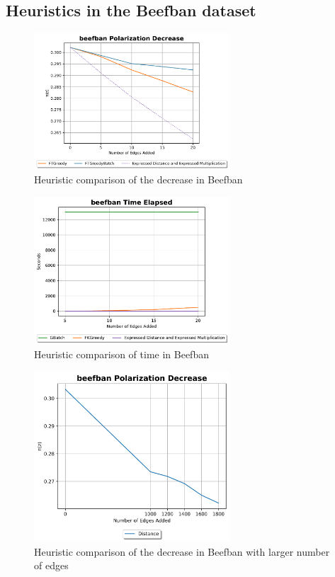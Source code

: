 \clearpage


\subsection{Heuristics in the Beefban dataset}
\begin{figure}[H]
	\centering
	\includegraphics[width=0.65\textwidth]{Figures/beefban Polarization Decrease}
	\caption{Heuristic comparison of the decrease in Beefban}
	\label{fig:beefban_pol}
\end{figure}


\begin{figure}[H]
	\centering
	\includegraphics[width=0.65\textwidth]{Figures/beefban Time Elapsed}
	\caption{Heuristic comparison of time in Beefban}
	\label{fig:beefban_time}
\end{figure}

\clearpage

\begin{figure}[H]
	\centering
	\includegraphics[width=0.65\textwidth]{Figures/beefban Polarization Decrease 2}
	\caption{Heuristic comparison of the decrease in Beefban with larger number of edges}
	\label{fig:beefban2_pol}
\end{figure}


